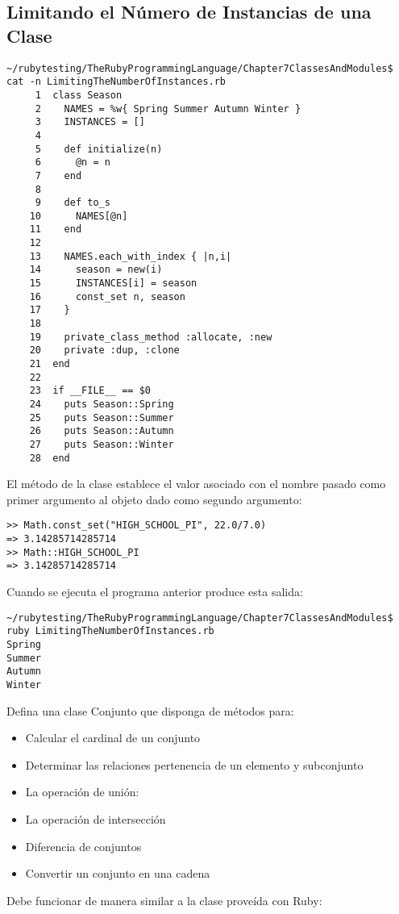 \subsection{Limitando el Número de Instancias de una Clase}
\begin{verbatim}
~/rubytesting/TheRubyProgrammingLanguage/Chapter7ClassesAndModules$ cat -n LimitingTheNumberOfInstances.rb 
     1  class Season
     2    NAMES = %w{ Spring Summer Autumn Winter }
     3    INSTANCES = []
     4  
     5    def initialize(n)
     6      @n = n
     7    end
     8  
     9    def to_s
    10      NAMES[@n]
    11    end
    12  
    13    NAMES.each_with_index { |n,i|
    14      season = new(i)
    15      INSTANCES[i] = season
    16      const_set n, season
    17    }
    18  
    19    private_class_method :allocate, :new
    20    private :dup, :clone
    21  end
    22  
    23  if __FILE__ == $0
    24    puts Season::Spring 
    25    puts Season::Summer
    26    puts Season::Autumn
    27    puts Season::Winter
    28  end
\end{verbatim}
El método 
de la clase 
establece el valor asociado con el nombre pasado como primer argumento al objeto dado como segundo argumento:
\begin{verbatim}
>> Math.const_set("HIGH_SCHOOL_PI", 22.0/7.0)
=> 3.14285714285714
>> Math::HIGH_SCHOOL_PI
=> 3.14285714285714
\end{verbatim}

Cuando se ejecuta el programa anterior produce esta salida:
\begin{verbatim}
~/rubytesting/TheRubyProgrammingLanguage/Chapter7ClassesAndModules$ ruby LimitingTheNumberOfInstances.rb 
Spring
Summer
Autumn
Winter
\end{verbatim}





Defina una clase Conjunto
que disponga de métodos para:
  \begin{itemize}
  \item
  Calcular el cardinal de un conjunto
  \item
  Determinar las relaciones pertenencia de un elemento y subconjunto
  \item
  La operaci\'{o}n de uni\'{o}n:
  \item
  La operaci\'{o}n de intersecci\'{o}n
  \item
  Diferencia de conjuntos
  \item
  Convertir un conjunto en una cadena
  \end{itemize}
Debe funcionar  de manera similar a la clase 
proveída con Ruby:


